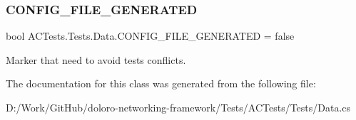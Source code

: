 \subsubsection{\texorpdfstring{C\+O\+N\+F\+I\+G\+\_\+\+F\+I\+L\+E\+\_\+\+G\+E\+N\+E\+R\+A\+T\+ED}{CONFIG\_FILE\_GENERATED}}
{\footnotesize\ttfamily bool A\+C\+Tests.\+Tests.\+Data.\+C\+O\+N\+F\+I\+G\+\_\+\+F\+I\+L\+E\+\_\+\+G\+E\+N\+E\+R\+A\+T\+ED = false\hspace{0.3cm}{\ttfamily [static]}}



Marker that need to avoid tests conflicts. 



The documentation for this class was generated from the following file\+:\begin{DoxyCompactItemize}
\item 
D\+:/\+Work/\+Git\+Hub/doloro-\/networking-\/framework/\+Tests/\+A\+C\+Tests/\+Tests/Data.\+cs\end{DoxyCompactItemize}
